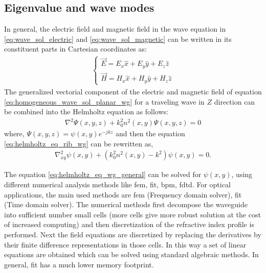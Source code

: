 \documentclass[../report.tex]{subfiles}
\begin{document}
		\subsection{Eigenvalue and wave modes}
In general, the electric field and magnetic field in the wave equation in \ref{eq:wave_sol_electric} and \ref{eq:wave_sol_magnetic} can be written in its constituent parts in Cartesian coordinates as:
\begin{equation}\label{eq:em_field_cart_cord}
\begin{aligned}
\begin{cases}
\overrightarrow{E}=E_{x}\widehat{x}+E_{y}\widehat{y}+E_{z}\widehat{z}\\
\overrightarrow{H}=H_{x}\widehat{x}+H_{y}\widehat{y}+H_{z}\widehat{z}
\end{cases}
\end{aligned}
\end{equation}
The generalized vectorial component of the electric and magnetic field of equation \ref{eq:homogeneous_wave_sol_planar_wg} for a traveling wave in $Z$ direction can be combined into the Helmholtz equation as follows:
\begin{equation}\label{eq:helmholtz_eq_rib_wg}
	\begin{aligned}
		\nabla ^{2}\Psi \left( x,y,z\right) +k_{0}^{2}n^{2}\left(x,y\right) \Psi \left( x,y,z\right) = 0
	\end{aligned}
\end{equation}
where, $\Psi \left( x,y,z\right) = \psi \left( x,y\right)e^{-jkz} $ and then the equation \ref{eq:helmholtz_eq_rib_wg} can be rewritten as,
\begin{equation}\label{eq:helmholtz_eq_wg_general}
\begin{aligned}
\nabla_{xy} ^{2}\psi \left( x,y\right) +\left(k_{0}^{2}n^{2}\left(x,y\right) - k^2\right)\psi \left( x,y\right) = 0.
\end{aligned}
\end{equation}

\noindent The equation \ref{eq:helmholtz_eq_wg_general} can be solved for $\psi \left( x,y\right)$, using different numerical analysis methods like \gls{fem}, \gls{fit}, \gls{bpm}, \gls{fdtd}. For optical applications, the main used methods are \gls{fem} (Frequency domain solver), \gls{fit} (Time domain solver). The numerical methods first decompose the waveguide into sufficient number small cells (more cells give more robust solution at the cost of increased computing) and then discretization of the refractive index profile is performed. Next the field equations are discretized by replacing the derivatives by their finite difference representations in those cells. In this way a set of linear equations are obtained which can be solved using standard algebraic methods. In general, \gls{fit} has a much lower memory footprint.\par
\end{document}
